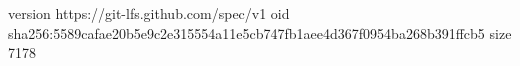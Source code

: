 version https://git-lfs.github.com/spec/v1
oid sha256:5589cafae20b5e9c2e315554a11e5cb747fb1aee4d367f0954ba268b391ffcb5
size 7178
